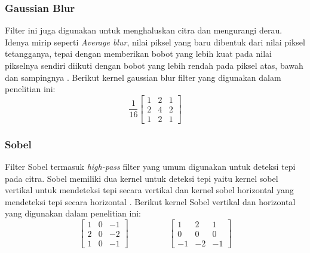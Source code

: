 \subsubsection{Gaussian Blur}
Filter ini juga digunakan untuk menghaluskan citra dan mengurangi derau. Idenya mirip seperti \textit{Average blur}, nilai piksel yang baru dibentuk dari nilai piksel tetangganya, tepai dengan memberikan bobot yang lebih kuat pada nilai pikselnya sendiri diikuti dengan bobot yang lebih rendah pada piksel atas, bawah dan sampingnya \cite{soa:dmitry}. Berikut kernel gaussian blur filter yang digunakan dalam penelitian ini:
\begin{equation}
    \label{kernel:gaussianblur}
    \frac{1}{16}
    \left[
    \begin{matrix}
 1 & 2 & 1 \\
 2 & 4 & 2 \\
 1 & 2 & 1
    \end{matrix}
    \right]
\end{equation}

\subsubsection{Sobel}
Filter Sobel termasuk \textit{high-pass} filter yang umum digunakan untuk deteksi tepi pada citra. Sobel memiliki dua kernel untuk deteksi tepi yaitu kernel sobel vertikal untuk mendeteksi tepi secara vertikal dan kernel sobel horizontal yang mendeteksi tepi secara horizontal \cite{pdf:marcin}. Berikut kernel Sobel vertikal dan horizontal yang digunakan dalam penelitian ini:
\begin{equation}
    \label{kernel:sobel}
    \left[
    \begin{matrix}
 1 & 0 & -1 \\
 2 & 0 & -2 \\
 1 & 0 & -1
    \end{matrix}
    \right]
    \hspace{2cm}
    \left[
 \begin{matrix}
 1 & 2 & 1 \\
 0 & 0 & 0 \\
 -1 & -2 & -1
    \end{matrix}
    \right]
\end{equation}

